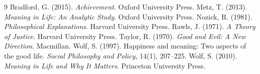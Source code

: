 \documentclass{situationist-preprint}
\begin{document}
\begin{thebibliography}{9}\small
{} Bradford, G. (2015). \emph{Achievement}. Oxford University Press.
 Metz, T. (2013). \emph{Meaning in Life: An Analytic Study}. Oxford University Press.
 Nozick, R. (1981). \emph{Philosophical Explanations}. Harvard University Press.
 Rawls, J. (1971). \emph{A Theory of Justice}. Harvard University Press.
 Taylor, R. (1970). \emph{Good and Evil: A New Direction}. Macmillan.
 Wolf, S. (1997). Happiness and meaning: Two aspects of the good life. \emph{Social Philosophy and Policy}, 14(1), 207--225.
 Wolf, S. (2010). \emph{Meaning in Life and Why It Matters}. Princeton University Press.
\end{thebibliography}
\end{document}
